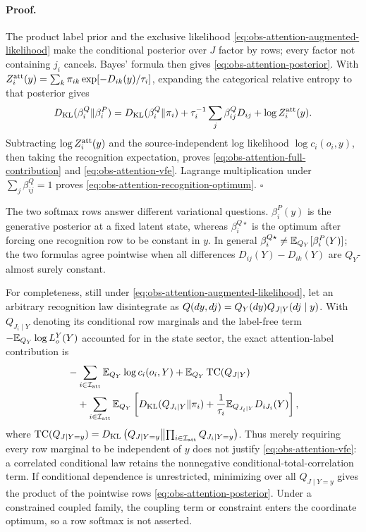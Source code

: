 \paragraph{Proof.}
The product label prior and the exclusive likelihood
\eqref{eq:obs-attention-augmented-likelihood} make the conditional posterior
over $J$ factor by rows; every factor not containing $j_i$ cancels.  Bayes'
formula then gives \eqref{eq:obs-attention-posterior}.  With
$Z_i^{\rm att}(y)=\sum_k\pi_{ik}\exp[-D_{ik}(y)/\tau_i]$, expanding the
categorical relative entropy to that posterior gives
\[
D_{\mathrm{KL}}(\beta^Q_i\Vert\beta^P_i)
=D_{\mathrm{KL}}(\beta^Q_i\Vert\pi_i)
+\tau_i^{-1}\sum_j\beta^Q_{ij}D_{ij}+\log Z_i^{\rm att}(y).
\]
Subtracting $\log Z_i^{\rm att}(y)$ and the source-independent log likelihood
$\log c_i(o_i,y)$, then taking the recognition expectation, proves
\eqref{eq:obs-attention-full-contribution} and
\eqref{eq:obs-attention-vfe}.
Lagrange multiplication under $\sum_j\beta^Q_{ij}=1$ proves
\eqref{eq:obs-attention-recognition-optimum}.  $\square$

The two softmax rows answer different variational questions.
$\beta^P_i(y)$ is the generative posterior at a fixed latent state, whereas
$\beta_i^{Q\star}$ is the optimum after forcing one recognition row to be
constant in $y$.  In general
$\beta_i^{Q\star}\ne\mathbb E_{Q_Y}[\beta_i^P(Y)]$; the two formulas agree pointwise
when all differences $D_{ij}(Y)-D_{ik}(Y)$ are $Q_Y$-almost surely constant.

For completeness, still under
\eqref{eq:obs-attention-augmented-likelihood}, let an arbitrary recognition law
disintegrate as
$Q(dy,dj)=Q_Y(dy)Q_{J\mid Y}(dj\mid y)$.  With
$Q_{J_i\mid Y}$ denoting its conditional row marginals and the label-free term
$-\mathbb E_{Q_Y}\log L_o^Y(Y)$ accounted for in the state sector, the exact
attention-label contribution is
\begin{equation}
\begin{split}
&-\sum_{i\in\mathcal I_{\rm att}}\mathbb E_{Q_Y}\log c_i(o_i,Y)
+\mathbb E_{Q_Y}\operatorname{TC}(Q_{J\mid Y})\\
&\quad+\sum_{i\in\mathcal I_{\rm att}}\mathbb E_{Q_Y}\left[
D_{\mathrm{KL}}(Q_{J_i\mid Y}\Vert\pi_i)
+\frac{1}{\tau_i}
\mathbb E_{Q_{J_i\mid Y}}D_{iJ_i}(Y)
\right],
\end{split}
\label{eq:obs-attention-correlated-ledger}
\end{equation}
where
$\operatorname{TC}(Q_{J\mid Y=y})=
D_{\mathrm{KL}}\left(Q_{J\mid Y=y}\middle\Vert
\prod_{i\in\mathcal I_{\rm att}}Q_{J_i\mid Y=y}\right)$.
Thus merely requiring every row marginal to be independent of $y$ does not
justify \eqref{eq:obs-attention-vfe}: a correlated conditional law retains the
nonnegative conditional-total-correlation term.  If conditional dependence is
unrestricted, minimizing over all $Q_{J\mid Y=y}$ gives the product of the
pointwise rows \eqref{eq:obs-attention-posterior}.  Under a constrained coupled
family, the coupling term or constraint enters the coordinate optimum, so a
row softmax is not asserted.  

